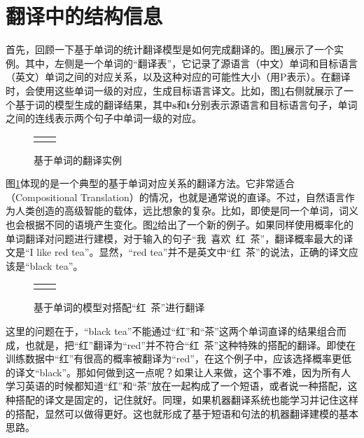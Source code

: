 \section{翻译中的结构信息}

\parinterval 首先，回顾一下基于单词的统计翻译模型是如何完成翻译的。图\ref{fig:4-1}展示了一个实例。其中，左侧是一个单词的``翻译表''，它记录了源语言（中文）单词和目标语言（英文）单词之间的对应关系，以及这种对应的可能性大小（用P表示）。在翻译时，会使用这些单词一级的对应，生成目标语言译文。比如，图\ref{fig:4-1}右侧就展示了一个基于词的模型生成的翻译结果，其中$\mathbf{s}$和$\mathbf{t}$分别表示源语言和目标语言句子，单词之间的连线表示两个句子中单词一级的对应。

\begin{figure}[htp]
\centering
\begin{tabular}{l r}
\subfigure{} & \subfigure{} \\
\end{tabular}
\caption{基于单词的翻译实例}
\label{fig:4-1}
\end{figure}

\parinterval 图\ref{fig:4-1}体现的是一个典型的基于单词对应关系的翻译方法。它非常适合{\small{}}（Compositional Translation）的情况，也就是通常说的直译。不过，自然语言作为人类创造的高级智能的载体，远比想象的复杂。比如，即使是同一个单词，词义也会根据不同的语境产生变化。图\ref{fig:4-2}给出了一个新的例子。如果同样使用概率化的单词翻译对问题进行建模，对于输入的句子``我\ 喜欢\ 红\ 茶''，翻译概率最大的译文是``I like red tea''。显然，``red tea''并不是英文中``红\ 茶''的说法，正确的译文应该是``black tea''。

\begin{figure}[htp]
\centering
\begin{tabular}{l r}
\subfigure{} & \subfigure{}
\end{tabular}
\caption{基于单词的模型对搭配``红\ 茶''进行翻译}
\label{fig:4-2}
\end{figure}

\parinterval 这里的问题在于，``black tea''不能通过``红''和``茶''这两个单词直译的结果组合而成，也就是，把``红''翻译为``red''并不符合``红\ 茶''这种特殊的搭配的翻译。即使在训练数据中``红''有很高的概率被翻译为``red''，在这个例子中，应该选择概率更低的译文``black''。那如何做到这一点呢？如果让人来做，这个事不难，因为所有人学习英语的时候都知道``红''和``茶''放在一起构成了一个短语，或者说一种搭配，这种搭配的译文是固定的，记住就好。同理，如果机器翻译系统也能学习并记住这样的搭配，显然可以做得更好。这也就形成了基于短语和句法的机器翻译建模的基本思路。

